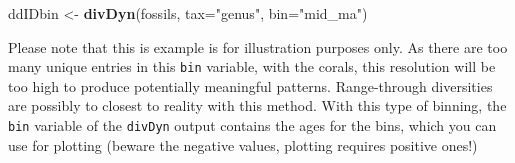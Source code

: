 \documentclass[]{article}
\newenvironment{Shaded}{\begin{snugshade}}{\end{snugshade}}
\newcommand{\CharTok}[1]{\textcolor[rgb]{0.31,0.60,0.02}{#1}}
\newcommand{\CommentTok}[1]{\textcolor[rgb]{0.56,0.35,0.01}{\textit{#1}}}
\newcommand{\DataTypeTok}[1]{\textcolor[rgb]{0.13,0.29,0.53}{#1}}
\newcommand{\DecValTok}[1]{\textcolor[rgb]{0.00,0.00,0.81}{#1}}
\newcommand{\KeywordTok}[1]{\textcolor[rgb]{0.13,0.29,0.53}{\textbf{#1}}}
\newcommand{\NormalTok}[1]{#1}
\newcommand{\OperatorTok}[1]{\textcolor[rgb]{0.81,0.36,0.00}{\textbf{#1}}}
\newcommand{\StringTok}[1]{\textcolor[rgb]{0.31,0.60,0.02}{#1}}
\begin{document}
\begin{Shaded}
\begin{Highlighting}[]
\NormalTok{ddIDbin <-}\StringTok{ }\KeywordTok{divDyn}\NormalTok{(fossils, }\DataTypeTok{tax=}\StringTok{"genus"}\NormalTok{, }\DataTypeTok{bin=}\StringTok{"mid_ma"}\NormalTok{)}
\end{Highlighting}
\end{Shaded}

Please note that this is example is for illustration purposes only. As
there are too many unique entries in this \texttt{bin} variable, with
the corals, this resolution will be too high to produce potentially
meaningful patterns. Range-through diversities are possibly to closest
to reality with this method. With this type of binning, the \texttt{bin}
variable of the \texttt{divDyn} output contains the ages for the bins,
which you can use for plotting (beware the negative values, plotting
requires positive ones!)

\begin{Shaded}
\end{Shaded}
\end{document}
